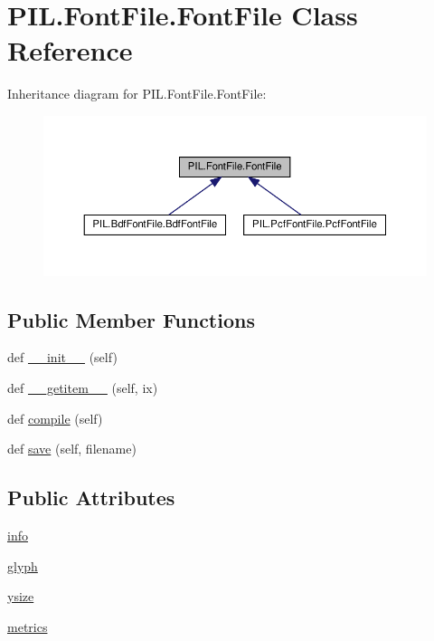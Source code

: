 \hypertarget{classPIL_1_1FontFile_1_1FontFile}{}\section{P\+I\+L.\+Font\+File.\+Font\+File Class Reference}
\label{classPIL_1_1FontFile_1_1FontFile}


Inheritance diagram for P\+I\+L.\+Font\+File.\+Font\+File\+:
\nopagebreak
\begin{figure}[H]
\begin{center}
\leavevmode
\includegraphics[width=350pt]{classPIL_1_1FontFile_1_1FontFile__inherit__graph}
\end{center}
\end{figure}
\subsection*{Public Member Functions}
\begin{DoxyCompactItemize}
\item 
def \hyperlink{classPIL_1_1FontFile_1_1FontFile_af9acac22aef056aa59e8a29ac071502d}{\+\_\+\+\_\+init\+\_\+\+\_\+} (self)
\item 
def \hyperlink{classPIL_1_1FontFile_1_1FontFile_a8b725099fa4c86e5dfd4d79833120207}{\+\_\+\+\_\+getitem\+\_\+\+\_\+} (self, ix)
\item 
def \hyperlink{classPIL_1_1FontFile_1_1FontFile_aec1bd19102ac5a9ef7031cddb0a4fd87}{compile} (self)
\item 
def \hyperlink{classPIL_1_1FontFile_1_1FontFile_a9b557113301e4ed5664e7a7913119c90}{save} (self, filename)
\end{DoxyCompactItemize}
\subsection*{Public Attributes}
\begin{DoxyCompactItemize}
\item 
\hyperlink{classPIL_1_1FontFile_1_1FontFile_a7c7b923256bb1bc3666c03cd6472ae24}{info}
\item 
\hyperlink{classPIL_1_1FontFile_1_1FontFile_a9d97e056baccfed1c6e93d0ef80e14ab}{glyph}
\item 
\hyperlink{classPIL_1_1FontFile_1_1FontFile_ae4d6418337cafd960e9d9d20fa9473e3}{ysize}
\item 
\hyperlink{classPIL_1_1FontFile_1_1FontFile_a9a7237708b16d83ec68794e34a96d9e9}{metrics}
\end{DoxyCompactItemize}
